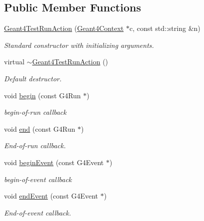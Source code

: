 \subsection*{Public Member Functions}
\begin{DoxyCompactItemize}
\item 
\hyperlink{class_d_d4hep_1_1_simulation_1_1_test_1_1_geant4_test_run_action_a59369c3b9a84e951c2885a3ec331b360}{Geant4TestRunAction} (\hyperlink{class_d_d4hep_1_1_simulation_1_1_geant4_context}{Geant4Context} $\ast$c, const std::string \&n)
\begin{DoxyCompactList}\small\item\em Standard constructor with initializing arguments. \item\end{DoxyCompactList}\item 
virtual \hyperlink{class_d_d4hep_1_1_simulation_1_1_test_1_1_geant4_test_run_action_a6ce0a9785be8b5d86be20d2bc5a3db64}{$\sim$Geant4TestRunAction} ()
\begin{DoxyCompactList}\small\item\em Default destructor. \item\end{DoxyCompactList}\item 
void \hyperlink{class_d_d4hep_1_1_simulation_1_1_test_1_1_geant4_test_run_action_a1df121c6a80d42e72c898e7303d5c64e}{begin} (const G4Run $\ast$)
\begin{DoxyCompactList}\small\item\em begin-\/of-\/run callback \item\end{DoxyCompactList}\item 
void \hyperlink{class_d_d4hep_1_1_simulation_1_1_test_1_1_geant4_test_run_action_a9cffefeecef4c952ad1fbbc80893aac8}{end} (const G4Run $\ast$)
\begin{DoxyCompactList}\small\item\em End-\/of-\/run callback. \item\end{DoxyCompactList}\item 
void \hyperlink{class_d_d4hep_1_1_simulation_1_1_test_1_1_geant4_test_run_action_af1b4e87826ebabd5a73c9fc4a1f853d5}{beginEvent} (const G4Event $\ast$)
\begin{DoxyCompactList}\small\item\em begin-\/of-\/event callback \item\end{DoxyCompactList}\item 
void \hyperlink{class_d_d4hep_1_1_simulation_1_1_test_1_1_geant4_test_run_action_ae93d60ada35540e3801472025ff23ded}{endEvent} (const G4Event $\ast$)
\begin{DoxyCompactList}\small\item\em End-\/of-\/event callback. \item\end{DoxyCompactList}\end{DoxyCompactItemize}


